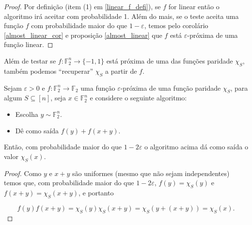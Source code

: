 \begin{proof}

Por definição (item (1) em \ref{linear_f_defi}), se $f$ for linear então o algoritmo irá aceitar com probabilidade 1. Além do mais, se o teste aceita uma função $f$ com probabilidade maior do que $1 - \varepsilon$, temos pelo corolário \ref{almost_linear_cor} e proposição \ref{almost_linear} que $f$ está $\varepsilon$-próxima de uma função linear.

\end{proof}

Além de testar se $f: \mathbb{F}_{2}^{n} \to \{-1, 1\}$ está próxima de uma das funções paridade $\chi_{S}$, também podemos ``recuperar'' $\chi_{S}$ a partir de $f$.

\begin{teo}

Sejam $\varepsilon > 0$ e $f: \mathbb{F}_{2}^{n} \to \mathbb{F}_{2}$ uma função $\varepsilon$-próxima de uma função paridade $\chi_{S}$, para algum $S \subseteq [n]$, seja $x \in \mathbb{F}_{2}^{n}$ e considere o seguinte algoritmo: 

\begin{itemize}

	\item Escolha $y \sim \mathbb{F}_{2}^{n}$.
	
	\item Dê como saída $f(y) + f(x + y)$.

\end{itemize}

Então, com probabilidade maior do que $1 - 2\varepsilon$ o algoritmo acima dá como saída o valor $\chi_{S}(x)$.

\end{teo}

\begin{proof}

Como $y$ e $x + y$ são uniformes (mesmo que não sejam independentes) temos que, com probabilidade maior do que $1 - 2\varepsilon$, $f(y) = \chi_{S}(y)$ e $f(x + y) = \chi_{S}(x + y)$, e portanto

\begin{equation*}
	f(y)f(x + y) = \chi_{S}(y)\chi_{S}(x + y) = \chi_{S}(y + (x + y)) = \chi_{S}(x).
\end{equation*}

\end{proof}